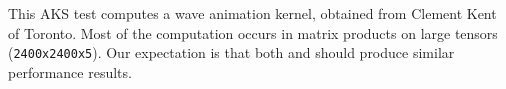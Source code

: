 This AKS test computes a wave animation kernel, obtained
from Clement Kent of Toronto. Most of the computation
occurs in matrix products on large tensors ({\tt 2400x2400x5}).
Our expectation is that both \wlf and \awlf should produce
similar performance results.

